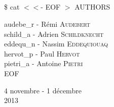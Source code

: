 \begin{titlepage}
    \begin{center}
        \textsc{\Large \reportsubject}\\[0.5cm]
        \HRule \\[0.4cm]
        {\huge \bfseries \reporttitle}\\[0.4cm]
        \HRule \\[1.5cm]
        \begin{minipage}[t]{0.8\textwidth}
                \huge \$ cat $<<$- EOF $>$ AUTHORS
        \end{minipage}

        \bigskip

        \begin{minipage}[t]{0.6\textwidth}
            \begin{flushleft} \large
                audebe\_r - Rémi \textsc{Audebert} \\
                schild\_a - Adrien \textsc{Schildknecht} \\
                eddequ\_n - Nassim \textsc{Eddequiouaq} \\
                hervot\_p - Paul \textsc{Hervot} \\
                pietri\_a - Antoine \textsc{Pietri} \\
                EOF \\
            \end{flushleft}
        \end{minipage}
        \vfill

        {\large 4 novembre - 1 décembre \\ 2013}

    \end{center}

\end{titlepage}
